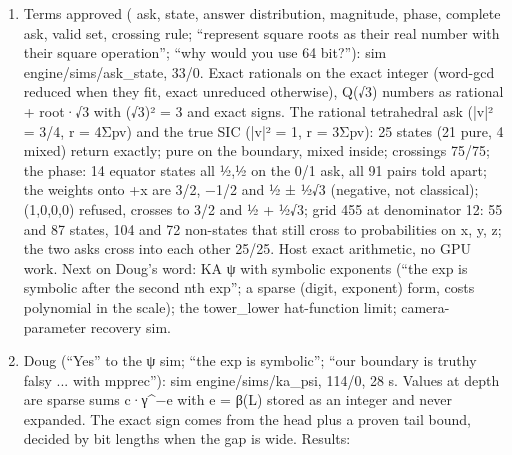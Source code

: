 \begin{enumerate}
\item Terms approved ( ask, state, answer distribution, magnitude, phase, complete ask, valid set, crossing rule; “represent square roots as their real number with their square operation”; “why would you use 64 bit?”): sim engine/sims/ask\_\allowbreak{}state, 33/0. Exact rationals on the exact integer (word-gcd reduced when they fit, exact unreduced otherwise), Q(√3) numbers as rational + root·√3 with (√3)² = 3 and exact signs. The rational tetrahedral ask (|v|² = 3/4, r = 4Σpv) and the true SIC (|v|² = 1, r = 3Σpv): 25 states (21 pure, 4 mixed) return exactly; pure on the boundary, mixed inside; crossings 75/75; the phase: 14 equator states all ½,½ on the 0/1 ask, all 91 pairs told apart; the weights onto +x are 3/2, −1/2 and ½ ± ½√3 (negative, not classical); (1,0,0,0) refused, crosses to 3/2 and ½ + ½√3; grid 455 at denominator 12: 55 and 87 states, 104 and 72 non-states that still cross to probabilities on x, y, z; the two asks cross into each other 25/25. Host exact arithmetic, no GPU work. Next on Doug's word: KA ψ with symbolic exponents (“the exp is symbolic after the second nth exp”; a sparse (digit, exponent) form, costs polynomial in the scale); the tower\_\allowbreak{}lower hat-function limit; camera-parameter recovery sim.
\item Doug (“Yes” to the ψ sim; “the exp is symbolic”; “our boundary is truthy falsy ... with mpprec”): sim engine/sims/ka\_\allowbreak{}psi, 114/0, 28 s. Values at depth are sparse sums c·γ\textasciicircum{}−e with e = β(L) stored as an integer and never expanded. The exact sign comes from the head plus a proven tail bound, decided by bit lengths when the gap is wide. Results:


\end{enumerate}
